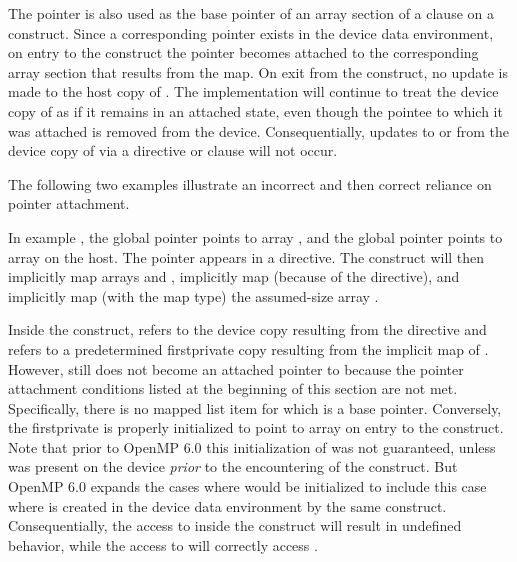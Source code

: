 The pointer  is also used as the base pointer of an array section of a
 clause on a  construct. Since a corresponding pointer
 exists in the device data environment, on entry to the construct the
pointer becomes attached to the corresponding array section that results from the
map. On exit from the construct, no update is made to the host copy of .
The implementation will continue to treat the device copy of  as if it
remains in an attached state, even though the pointee to which it was attached is
removed from the device. Consequentially, updates to or from the device copy of
 via a  directive or  clause will not
occur.



The following two examples illustrate an incorrect and then correct reliance on
pointer attachment.

In example , the global pointer  points to
array , and the global pointer  points to array  on
the host. The pointer  appears in a  directive.
The  construct will then implicitly map arrays  and
, implicitly map  (because of the 
directive), and implicitly map (with the  map type) the
assumed-size array .

Inside the  construct,  refers to the device copy
resulting from the  directive and  refers to a
predetermined firstprivate copy resulting from the implicit map of
. However,  still does not become an attached pointer to
 because the pointer attachment conditions listed at the beginning of
this section are not met. Specifically, there is no mapped list item for which
 is a base pointer. Conversely, the firstprivate  is
properly initialized to point to array  on entry to the 
construct. Note that prior to OpenMP 6.0 this initialization of  was
not guaranteed, unless  was present on the device \emph{prior} to the
encountering of the  construct. But OpenMP 6.0 expands the cases
where  would be initialized to include this case where  is
created in the device data environment by the same construct. Consequentially,
the access to  inside the  construct will result in
undefined behavior, while the access to  will correctly access
.


